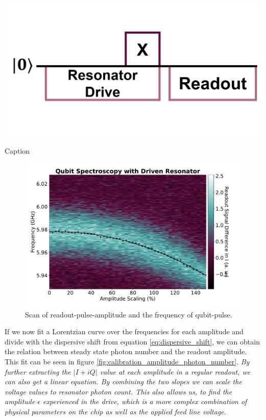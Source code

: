 \begin{marginfigure}[-4 cm]
    \centering
    \includegraphics{Figs/circuits/photon_counting.png}
    \caption{Caption}
    \label{fig:enter-label}
\end{marginfigure}

\begin{figure}[h]
    \centering
    \includegraphics[]{Calibrations/Figures/Qubit Spectroscopy with Driven Resonator.pdf}
    \caption{Scan of readout-pulse-amplitude and the frequency of qubit-pulse.}
    \label{fig:calibration_photon_counting_scan}
\end{figure}

If we now fit a Lorentzian curve over the frequencies for each amplitude and divide with the dispersive shift from equation \ref{eq:dispersive_shift}, we can obtain the relation between steady state photon number and the readout amplitude. This fit can be seen in figure \ref{fig:calibration_amplitude_photon_number}. \textit{By further extracting the $|I+iQ|$ value at each amplitude in a regular readout, we can also get a linear equation. By combining the two slopes we can scale the voltage values to resonator photon count. This also allows us, to find the amplitude $\epsilon$ experienced in the drive, which is a more complex combination of physical parameters on the chip as well as the applied feed line voltage.}


